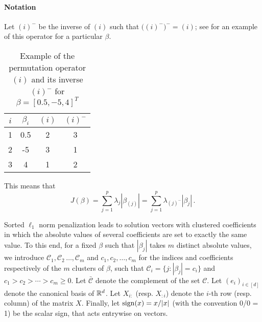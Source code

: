 \paragraph{Notation}\label{sec:notation}

Let \((i)^{-}\) be the inverse of \((i)\) such that
\(\big((i)^-\big)^- = (i)\); see  for an
example of this operator for a particular \(\beta\).
\begin{table}[hbt]
  \centering
  \caption{Example of the permutation operator \((i)\) and its inverse
    \((i)^-\) for $\beta = [0.5, -5, 4]^T$}
    \label{tab:permutation-example}
  \begin{tabular}{cS[table-format=-1.1,round-mode=off]cc}
    \toprule
    \(i\) & {\(\beta_i\)} & \((i)\) & \((i)^-\) \\
         & 0.5         & 2       & 3         \\
    2     & -5          & 3       & 1         \\
    3     & 4           & 1       & 2         \\
    \bottomrule
  \end{tabular}
\end{table}
This means that
\[
  J(\beta) = \sum_{j=1}^p \lambda_j |\beta_{(j)}|
  = \sum_{j=1}^p \lambda_{(j)^-}|\beta_j| \,.
\]

Sorted $\ell_1$ norm penalization leads to solution vectors with clustered coefficients in which the absolute values of several coefficients are set to exactly the same value.
To this end, for a fixed $\beta$ such that $|\beta_j|$ takes $m$ distinct absolute values, we introduce \(\mathcal{C}_1, \mathcal{C}_2\, \dots, \mathcal{C}_m\) and \(c_1,
c_2, \dots, c_m\) for the indices and coefficients respectively of the \(m\)
clusters of $\beta$, such that
$\mathcal{C}_i = \{j : |\beta_j| = c_i\}$ and $c_1 > c_2 > \cdots > c_m \geq 0.$
Let \(\bar{\mathcal{C}}\) denote the complement of the set \(\mathcal{C}\).
Let $(e_i)_{i \in [d]}$ denote the canonical basis of $\mathbb{R}^d$.
Let $X_{i:}$ (resp. $X_{:i}$) denote the $i$-th row (resp. column) of the matrix $X$.
Finally, let $\operatorname{sign}(x) = x / |x|$ (with the convention 0/0 = 1) be the scalar sign, that acts entrywise on vectors.


